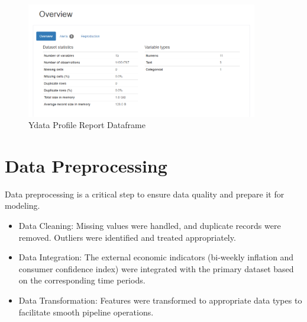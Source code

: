 \documentclass{article}
\begin{document}
\begin{figure}[H] 
\begin{center}
\centering
\includegraphics[width=0.9\textwidth]{images/train_ydata.png}
\caption{Ydata Profile Report Dataframe}
\end{center}
\end{figure}
    

\section{Data Preprocessing}
Data preprocessing is a critical step to ensure data quality and prepare it for modeling.
\begin{itemize}
    \item Data Cleaning: Missing values were handled, and duplicate records were removed. Outliers were identified and treated appropriately.
    \item Data Integration: The external economic indicators (bi-weekly inflation and consumer confidence index) were integrated with the primary dataset based on the corresponding time periods.
    \item Data Transformation: Features were transformed to appropriate data types to facilitate smooth pipeline operations.
\end{itemize}
\end{document}
